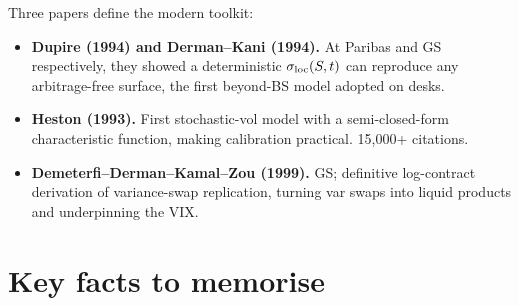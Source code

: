 \begin{historybox}
Three papers define the modern toolkit:
\begin{itemize}
  \item \textbf{Dupire (1994) and Derman--Kani (1994).} At Paribas and
    GS respectively, they showed a deterministic
    $\sigma_{\text{loc}}(S,t)$ can reproduce any arbitrage-free
    surface, the first beyond-BS model adopted on desks.
  \item \textbf{Heston (1993).} First stochastic-vol model with a
    semi-closed-form characteristic function, making calibration
    practical. 15{,}000+ citations.
  \item \textbf{Demeterfi--Derman--Kamal--Zou (1999).} GS; definitive
    log-contract derivation of variance-swap replication, turning
    var swaps into liquid products and underpinning the VIX.
\end{itemize}
\end{historybox}


\section*{Key facts to memorise}
\label{sec:equity_deriv_keyfacts}


